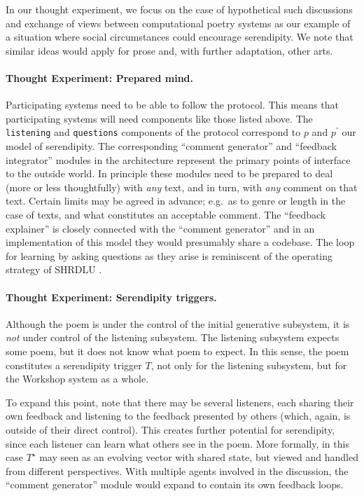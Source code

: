 \bigskip



\bigskip

\noindent In our thought experiment, we focus on the case of hypothetical such discussions and exchange of views between computational poetry systems as our example of a situation where social circumstances could encourage serendipity. We note that similar
ideas would apply for prose and, with further adaptation, other arts.

\paragraph{Thought Experiment: Prepared mind.}
Participating systems need to be able to follow the protocol.  This
means that participating systems will need components like those
listed above. The {\tt listening} and {\tt questions} components of
the protocol correspond to $p$ and $p^{\prime}$ our model of
serendipity.  The corresponding ``comment generator'' and ``feedback
integrator'' modules in the architecture represent the primary points
of interface to the outside world.  In principle these modules need to
be prepared to deal (more or less thoughtfully) with \emph{any} text,
and in turn, with \emph{any} comment on that text.  Certain limits may
be agreed in advance; e.g.~as to genre or length in the case of texts,
and what constitutes an acceptable comment.  The ``feedback
explainer'' is closely connected with the ``comment generator'' and in
an implementation of this model they would presumably share a
codebase.  The loop for learning by asking questions as they arise is
reminiscent of the operating strategy of {\sf SHRDLU}
\cite{winograd1972understanding}.

\paragraph{Thought Experiment: Serendipity triggers.}

Although the poem is under the control of the initial generative
subsystem, it is \emph{not} under control of the listening subsystem.
The listening subsystem expects some poem, but it does not know what
poem to expect.  In this sense, the poem constitutes a serendipity
trigger $T$, not only for the listening subsystem, but for the
Workshop system as a whole.

To expand this point, note that there may be several listeners, each
sharing their own feedback and listening to the feedback presented by
others (which, again, is outside of their direct control).  This
creates further potential for serendipity, since each listener can
learn what others see in the poem.  More formally, in this case
$T^\star$ may seen as an evolving vector with shared state, but viewed
and handled from different perspectives.  With multiple agents
involved in the discussion, the ``comment generator'' module would
expand to contain its own feedback loops.

